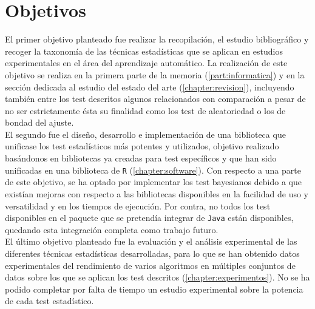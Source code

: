 \chapter*{Objetivos}

	El primer objetivo planteado fue realizar la 
recopilación, el estudio bibliográfico y recoger la 
taxonomía de las técnicas estadísticas que se aplican
en estudios experimentales en el área del aprendizaje
automático. La realización de este objetivo se realiza
en la primera parte de la memoria (\ref{part:informatica}) y
en la sección dedicada al estudio del estado del arte 
(\ref{chapter:revision}), incluyendo también entre los
test descritos algunos relacionados con comparación a
pesar de no ser estrictamente ésta su finalidad
como los test de aleatoriedad o los de bondad del 
ajuste.\\
	El segundo fue el diseño, desarrollo
e implementación de una biblioteca que unificase los test
estadísticos más potentes y utilizados, objetivo 
realizado basándonos en bibliotecas ya creadas para 
test específicos y que han sido unificadas en una biblioteca
de \texttt{R} (\ref{chapter:software}). Con respecto a una parte de este objetivo, se ha optado por implementar
los test bayesianos debido a que existían mejoras con 
respecto a las bibliotecas disponibles en la facilidad de
uso y versatilidad y en los tiempos de ejecución. Por contra, 
no todos los test disponibles en el paquete que se pretendía
integrar de \texttt{Java} están disponibles, quedando esta
integración completa como trabajo futuro. \\
	El último objetivo planteado fue la evaluación y el 
análisis experimental de las diferentes técnicas estadísticas 
desarrolladas, para lo que se han obtenido datos 
experimentales del rendimiento de varios algoritmos en 
múltiples conjuntos de  datos sobre los que se aplican los 
test descritos (\ref{chapter:experimentos}). No se ha podido
completar por falta de tiempo un estudio experimental sobre
la potencia de cada test estadístico.



	

